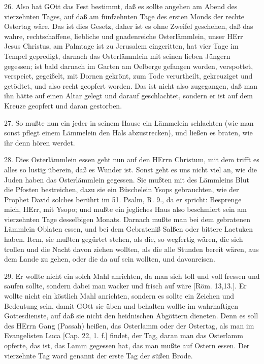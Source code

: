26. Also hat GOtt das Fest bestimmt, daß es sollte angehen am Abend des vierzehnten Tages, auf daß am fünfzehnten Tage des ersten Monds der rechte Ostertag wäre. Das ist dies Gesetz, daher ist es ohne Zweifel geschehen, daß das wahre, rechtschaffene, liebliche und gnadenreiche Osterlämmlein, unser HErr Jesus Christus, am Palmtage ist zu Jerusalem eingeritten, hat vier Tage im Tempel gepredigt, darnach das Osterlämmlein mit seinen lieben Jüngern gegessen; ist bald darnach im Garten am Oelberge gefangen worden, verspottet, verspeiet, gegeißelt, mit Dornen gekrönt, zum Tode verurtheilt, gekreuziget und getödtet, und also recht geopfert worden. Das ist nicht also zugegangen, daß man ihn hätte auf einen Altar gelegt und darauf geschlachtet, sondern er ist auf dem Kreuze geopfert und daran gestorben.

27. So mußte nun ein jeder in seinem Hause ein Lämmelein schlachten (wie man sonst pflegt einem Lämmelein den Hals abzustrecken), und ließen es braten, wie ihr denn hören werdet.

28. Dies Osterlämmlein essen geht nun auf den HErrn Christum, mit dem trifft es alles so lustig überein, daß es Wunder ist. Sonst geht es uns nicht viel an, wie die Juden haben das Osterlämmlein gegessen. Sie mußten mit des Lämmleins Blut die Pfosten bestreichen, dazu sie ein Büschelein Ysops gebrauchten, wie der Prophet David solches berührt im 51. Psalm, R. 9., da er spricht: Besprenge mich, HErr, mit Ysopo; und mußte ein jegliches Haus also beschmiert sein am vierzehnten Tage desselbigen Monats. Darnach mußte man bei dem gebratenen Lämmlein Oblaten essen, und bei dem Gebrateniß Salßen oder bittere Lactuken haben. Item, sie mußten gegürtet stehen, als die, so wegfertig wären, die sich trollen und die Nacht davon ziehen wollten, als die alle Stunden bereit wären, aus dem Lande zu gehen, oder die da auf sein wollten, und davonreisen.

29. Er wollte nicht ein solch Mahl anrichten, da man sich toll und voll fressen und saufen sollte, sondern dabei man wacker und frisch auf wäre [Röm. 13,13.]. Er wollte nicht ein köstlich Mahl anrichten, sondern es sollte ein Zeichen und Bedeutung sein, damit GOtt sie üben und behalten wollte im wahrhaftigen Gottesdienste,
auf daß sie nicht den heidnischen Abgöttern dieneten. Denn es soll des HErrn Gang (Passah) heißen, das Osterlamm oder der Ostertag, als man im Evangelisten Luca [Cap. 22, 1. f.] findet, der Tag, daran man das Osterlamm opferte, das ist, das Lamm gegessen hat, das man mußte auf Ostern essen. Der vierzehnte Tag ward genannt der erste Tag der süßen Brode.


